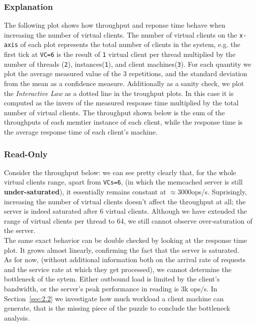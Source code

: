 \documentclass[11pt,a4paper]{article}
\begin{document}
\subsubsection{Explanation}

The following plot shows how throughput and reponse time behave when increasing the number of virtual clients.
The number of virtual clients on the \texttt{x-axis} of each plot represents the total number of clients in the system, e.g. the first tick at \texttt{VC=6} is the result of \texttt{1} virtual client per thread multiplied by the number of threads (\texttt{2}), instances(\texttt{1}), and client machines(\texttt{3}).
For each quantity we plot the average measured value of the 3 repetitions, and the standard deviation from the mean as a confidence measure.
Additionally as a sanity check, we plot the \textit{Interactive Law} as a dotted line in the troughput plots.
In this case it is computed as the invers of the measured response time multiplied by the total number of virtual clients.
The throughput shown below is the sum of the throughputs of each memtier instance of each client, while the response time is the average response time of each client's machine. 

\subsubsection*{Read-Only}

Consider the throughput below: we can see pretty clearly that, for the whole virtual clients range, apart from \texttt{VCs=6}, (in which the memcached server is still \textbf{under-saturated}), it essentially remains constant at $\approx 3000$ops/s. Suprisingly, increasing the number of virtual clients doesn't affect the throughput at all; the server is indeed saturated after 6 virtual clients. Although we have extended the range of virtual clients per thread to 64, we still cannot observe over-saturation of the server.\\
The same exact behavior can be double checked by looking at the response time plot. It grows almost linearly, confirming the fact that the server is saturated.\\ As for now, (without additional information both on the arrival rate of requests and the service rate at which they get processed), we cannot determine the bottleneck of the sytem. Either outbound load is limited by the client's bandwidth, or the server's peak performance in reading is 3k ops/s. In Section~\ref{sec:2.2} we investigate how much workload a client machine can generate, that is the missing piece of the puzzle to conclude the bottleneck analysis.
\end{document}
